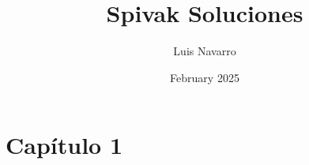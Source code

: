 \documentclass{article}
\title{Spivak Soluciones}
\author{Luis Navarro}
\date{February 2025}
\begin{document}
\maketitle

\section*{Capítulo 1}
\end{document}
